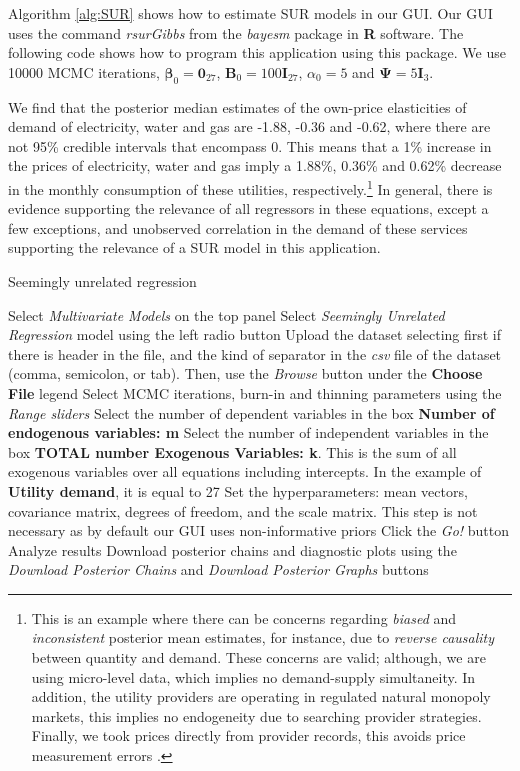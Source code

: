 Algorithm \ref{alg:SUR} shows how to estimate SUR models in our GUI. Our GUI uses the command \textit{rsurGibbs} from the \textit{bayesm} package in \textbf{R} software. The following code shows how to program this application using this package. We use 10000 MCMC iterations, $\bm{\beta}_0=\bm{0}_{27}$, $\bm{B}_0=100\bm{I}_{27}$, $\alpha_0=5$ and $\bm{\Psi}=5\bm{I}_3$.

We find that the posterior median estimates of the own-price elasticities of demand of electricity, water and gas are -1.88, -0.36 and -0.62, where there are not 95\% credible intervals that encompass 0. This means that a 1\% increase in the prices of electricity, water and gas imply a 1.88\%, 0.36\% and 0.62\% decrease in the monthly consumption of these utilities, respectively.\footnote{This is an example where there can be concerns regarding \textit{biased} and \textit{inconsistent} posterior mean estimates, for instance, due to \textit{reverse causality} between quantity and demand. These concerns are valid; although, we are using micro-level data, which implies no demand-supply simultaneity. In addition, the utility providers are operating in regulated natural monopoly markets, this implies no endogeneity due to searching provider strategies. Finally, we took prices directly from provider records, this avoids price measurement errors \cite{ramirez2024welfare}.} In general, there is evidence supporting the relevance of all regressors in these equations, except a few exceptions, and unobserved correlation in the demand of these services supporting the relevance of a SUR model in this application.   

\begin{algorithm}[h!]
	\caption{Seemingly unrelated regression}\label{alg:SUR}
	\begin{algorithmic}[1]  		 			
		\State Select \textit{Multivariate Models} on the top panel
		\State Select \textit{Seemingly Unrelated Regression} model using the left radio button
		\State Upload the dataset selecting first if there is header in the file, and the kind of separator in the \textit{csv} file of the dataset (comma, semicolon, or tab). Then, use the \textit{Browse} button under the \textbf{Choose File} legend
		\State Select MCMC iterations, burn-in and thinning parameters using the \textit{Range sliders}
		\State Select the number of dependent variables in the box \textbf{Number of endogenous variables: m}
		\State Select the number of independent variables in the box \textbf{TOTAL number Exogenous Variables: k}. This is the sum of all exogenous variables over all equations including intercepts. In the example of \textbf{Utility demand}, it is equal to 27
		\State Set the hyperparameters: mean vectors, covariance matrix, degrees of freedom, and the scale matrix. This step is not necessary as by default our GUI uses non-informative priors
		\State Click the \textit{Go!} button
		\State Analyze results
		\State Download posterior chains and diagnostic plots using the \textit{Download Posterior Chains} and \textit{Download Posterior Graphs} buttons
	\end{algorithmic} 
\end{algorithm}


